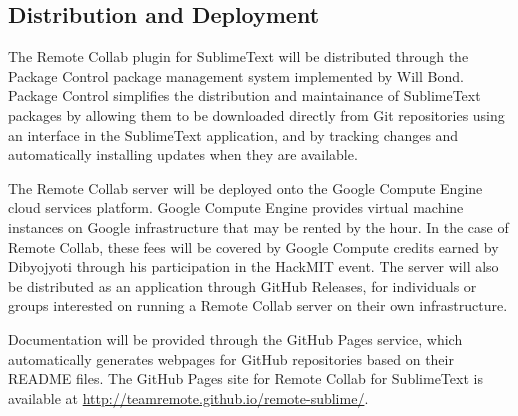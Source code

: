 \documentclass[11pt,english]{article}
\begin{document}
	\subsection{Distribution and Deployment}
		The Remote Collab plugin for SublimeText will be distributed through the Package Control\cite{packagecontrol} package management system implemented by Will Bond. Package Control simplifies the distribution and maintainance of SublimeText packages by allowing them to be downloaded directly from Git repositories using an interface in the SublimeText application, and by tracking changes and automatically installing updates when they are available.

		The Remote Collab server will be deployed onto the Google Compute Engine\cite{googlecompute} cloud services platform. Google Compute Engine provides virtual machine instances on Google infrastructure that may be rented by the hour. In the case of Remote Collab, these fees will be covered by Google Compute credits earned by Dibyojyoti through his participation in the HackMIT event. The server will also be distributed as an application through GitHub Releases, for individuals or groups interested on running a Remote Collab server on their own infrastructure.

		Documentation will be provided through the GitHub Pages\cite{gh-pages} service, which automatically generates webpages for GitHub repositories based on their README files. The GitHub Pages site for Remote Collab for SublimeText is available at \url{http://teamremote.github.io/remote-sublime/}.
	
	
\end{document}
